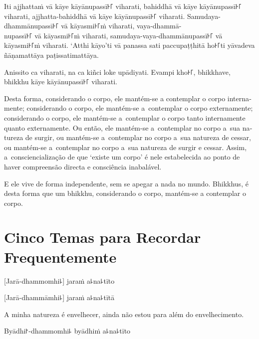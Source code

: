 Iti ajjhattaṁ vā kāye kāyānupassī꜔꜒ viharati, bahiddhā vā kāye kāyānupassī꜔꜒
viharati, ajjhatta-bahiddhā vā kāye kāyānupassī꜔꜒ viharati. Samudaya-dhammānupassī꜔꜒
vā kāyasmi꜔꜒ṁ viharati, vaya-dhammā-\\
nupassī꜔꜒ vā kāyasmi꜔꜒ṁ viharati, samudaya-vaya-dhammānupassī꜔꜒ vā kāyasmi꜔꜒ṁ viharati.
‘Atthi kāyo’ti vā panassa sati paccupaṭṭhitā ho꜔꜒ti yāvadeva ñāṇamattāya
paṭissatimattāya.

Anissito ca viharati, na ca kiñci loke upādiyati. Evampi kho꜔꜒,
bhikkhave, bhikkhu kāye kāyānupassī꜔꜒ viharati.

\begin{english}
  Desta forma, considerando o corpo, ele mantém-se a contemplar o corpo internamente;
  considerando o corpo, ele mantém-se a~contemplar o corpo externamente;
  considerando o corpo, ele mantém-se a~contemplar o corpo tanto internamente quanto
  externamente. Ou então, ele mantém-se a~contemplar no corpo a~sua natureza de surgir,
  ou mantém-se a~contemplar no corpo a~sua natureza de cessar, ou mantém-se a~contemplar
  no corpo a~sua natureza de surgir e cessar. Assim, a~consciencialização de que ‘existe
  um corpo’ é nele estabelecida ao ponto de haver compreensão directa e consciência inabalável.

  \bigskip

  E ele vive de forma independente, sem se apegar a nada no mundo. Bhikkhus,
  é desta forma que um bhikkhu, considerando o corpo, mantém-se a contemplar o corpo.
\end{english}

\chapter[Cinco Temas]{Cinco Temas para Recordar Frequentemente}


\begin{leader}
\end{leader}

%
[Jarā-dhammomhi꜕] jaraṁ a꜕na꜕tīto

%
[Jarā-dhammāmhi꜕] jaraṁ a꜕na꜕tītā

\begin{english}
  A minha natureza é envelhecer, ainda não estou para além do envelhecimento.
\end{english}

%
Byādhi꜓-dhammomhi꜕ byādhiṁ a꜕na꜕tīto

